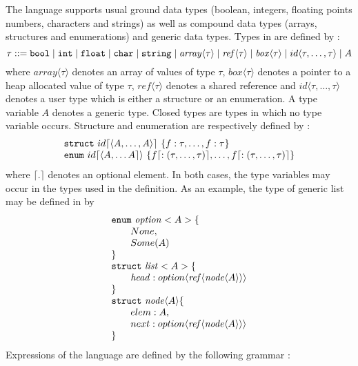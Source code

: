 \documentclass[12pt]{article}
\def\sail{{\sc{sail}}}
\def\integer{{\tt{int}}}
\def\bool{{\tt{bool}}}
\def\char{{\tt{char}}}
\def\str{{\tt{string}}}
\def\reftype{\mathit{ref}}
\def\boxtype{\mathit{box}}
\def\arraytype{\mathit{array}}
\def\struct{{\tt{struct}}}
\def\enum{{\tt{enum}}}
\begin{document}
The \sail{} language supports usual ground data types (boolean, integers, floating points numbers, 
characters and strings) as well as compound data types (arrays, structures and enumerations) and generic data types.
Types in \sail{} are defined by : 
$$
\tau ::= \bool \mid \integer \mid  {\tt{float}} \mid \char \mid \str \\
\mid \arraytype \langle\tau\rangle \mid \reftype\langle\tau\rangle \mid \boxtype \langle \tau \rangle \mid id\langle \tau,\ldots,\tau\rangle \mid A
$$
where $\arraytype\langle\tau\rangle$ denotes an array of values of type $\tau$, $\boxtype\langle\tau\rangle$ 
denotes a pointer to a heap allocated value of type $\tau$, $\reftype\langle\tau\rangle$ denotes a shared reference and 
$id\langle \tau,\ldots,\tau \rangle$ denotes a user type which is either a structure or an enumeration.
A type variable $A$ denotes a generic type. Closed types are types in which no type variable occurs.
Structure and enumeration are respectively defined by : 
$$
\begin{array}{lcl}
  \struct~id\lceil\langle A,\ldots,A \rangle\rceil~\{f:\tau,\ldots,f:\tau\} \\
  \enum~id\lceil\langle A, \ldots A\rceil\rangle~\{f\lceil :(\tau,\ldots,\tau) \rceil,\ldots,f\lceil :(\tau,\ldots,\tau)\rceil\}\\ 
\end{array}
$$
where $\lceil . \rceil$ denotes an optional element.
In both cases, the type variables may occur in the types used in the definition.
As an example, the type of generic list may be defined in \sail{} by 
$$
\begin{array}{l}
  \enum~{\mathit{option}}<A>\{\\
  \qquad None,\\
  \qquad Some (A)\\
  \}\\
  \struct~{\mathit{list}}<A>\{\\
  \qquad {\mathit{head}} : option \langle \reftype\langle {\mathit{node}\langle A\rangle}\rangle \rangle \\\}\\
  \struct~{\mathit{node}}\langle A\rangle \{\\
  \qquad elem : A, \\
  \qquad next : option \langle \reftype\langle {\mathit{node}\langle A\rangle}\rangle \rangle \\
  \}
\end{array}
$$
Expressions of the {\sail} language are defined by the following grammar :
\end{document}
